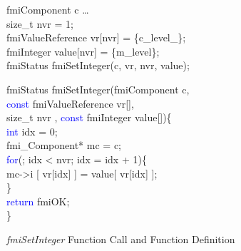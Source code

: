 \documentclass{llncs}%
\begin{document}
\begin{figure}
\centering
\begin{minipage}{0.49\textwidth}
fmiComponent c \ldots\\
size\_t nvr = 1; \\
fmiValueReference vr[nvr] = \{c\_level\_\};\\
fmiInteger value[nvr] = \{m\_level\};\\
fmiStatus fmiSetInteger(c, vr, nvr, value);\\
\end{minipage}
\begin{minipage}{0.49\textwidth}
fmiStatus fmiSetInteger(fmiComponent c,\\
\hspace*{0.8cm}\textcolor{blue}{const} fmiValueReference vr[],\\
\hspace*{0.8cm} size\_t nvr , \textcolor{blue}{const} fmiInteger value[])\{\\
\hspace*{0.2cm}\textcolor{blue}{int} idx = 0;\\
\hspace*{0.2cm}fmi\_Component* mc = c;\\
\hspace*{0.2cm}\textcolor{blue}{for}(; idx < nvr; idx = idx + 1)\{\\
\hspace*{0.4cm}mc->i [ vr[idx] ] = value[ vr[idx] ];\\
\hspace*{0.2cm}\}\\
\hspace*{0.2cm}\textcolor{blue}{return} fmiOK;\\
\}
\end{minipage}
\caption{\emph{fmiSetInteger} Function Call and Function Definition}
\label{fig:fmiSetIntC}
\end{figure}
%
%
\end{document}

